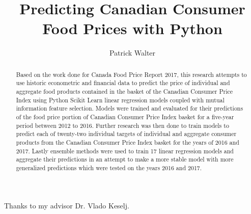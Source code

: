 \documentclass[12pt]{dalthesis}
\begin{document}
\title{Predicting Canadian Consumer Food Prices with Python}
\author{Patrick Walter}

\bcshon  %




\nolistoftables
\nolistoffigures





\frontmatter

\begin{abstract}
Based on the work done for Canada Food Price Report 2017, this research attempts to use historic econometric and financial data to predict the price of individual and aggregate food products contained in the basket of the Canadian Consumer Price Index using Python Scikit Learn linear regression models coupled with mutual information feature selection. Models were trained and evaluated for their predictions of the food price portion of Canadian Consumer Price Index basket for a five-year period between 2012 to 2016. Further research was then done to train models to predict each of twenty-two individual targets of individual and aggregate consumer products from the Canadian Consumer Price Index basket for the years of 2016 and 2017. Lastly ensemble methods were used to train 17 linear regression models and aggregate their predictions in an attempt to make a more stable model with more generalized predictions which were tested on the years 2016 and 2017.
\end{abstract}

\begin{acknowledgements}
Thanks to my advisor Dr. Vlado Keselj.
\end{acknowledgements}
\end{document}
